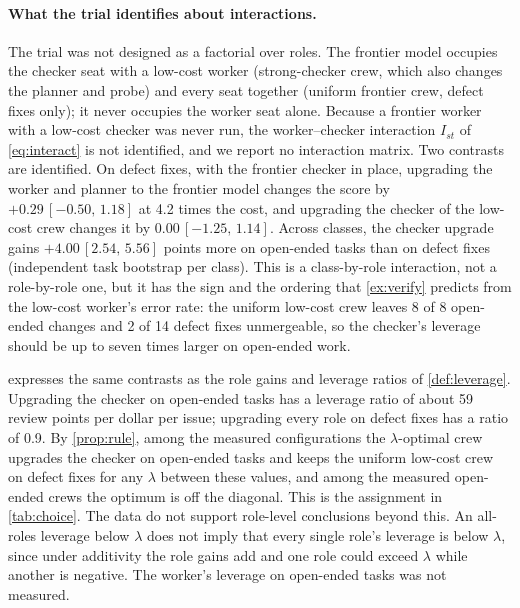 \documentclass[11pt,a4paper]{article}
\theoremstyle{definition}
\theoremstyle{remark}
\theoremstyle{definition}
\newcommand{\ci}[2]{\,[#1,\,#2]}
\begin{document}
\paragraph{What the trial identifies about interactions.} The trial was not designed as a factorial over roles. The frontier model occupies the checker seat with a low-cost worker (strong-checker crew, which also changes the planner and probe) and every seat together (uniform frontier crew, defect fixes only); it never occupies the worker seat alone. Because a frontier worker with a low-cost checker was never run, the worker--checker interaction $I_{st}$ of \eqref{eq:interact} is not identified, and we report no interaction matrix. Two contrasts are identified. On defect fixes, with the frontier checker in place, upgrading the worker and planner to the frontier model changes the score by $+0.29\ci{-0.50}{1.18}$ at 4.2 times the cost, and upgrading the checker of the low-cost crew changes it by $0.00\ci{-1.25}{1.14}$. Across classes, the checker upgrade gains $+4.00\ci{2.54}{5.56}$ points more on open-ended tasks than on defect fixes (independent task bootstrap per class). This is a class-by-role interaction, not a role-by-role one, but it has the sign and the ordering that \cref{ex:verify} predicts from the low-cost worker's error rate: the uniform low-cost crew leaves 8 of 8 open-ended changes and 2 of 14 defect fixes unmergeable, so the checker's leverage should be up to seven times larger on open-ended work.

 expresses the same contrasts as the role gains and leverage ratios of \cref{def:leverage}. Upgrading the checker on open-ended tasks has a leverage ratio of about 59 review points per dollar per issue; upgrading every role on defect fixes has a ratio of 0.9. By \cref{prop:rule}, among the measured configurations the $\lambda$-optimal crew upgrades the checker on open-ended tasks and keeps the uniform low-cost crew on defect fixes for any $\lambda$ between these values, and among the measured open-ended crews the optimum is off the diagonal. This is the assignment in \cref{tab:choice}. The data do not support role-level conclusions beyond this. An all-roles leverage below $\lambda$ does not imply that every single role's leverage is below $\lambda$, since under additivity the role gains add and one role could exceed $\lambda$ while another is negative. The worker's leverage on open-ended tasks was not measured.

\begin{table}[tbp]
\centering\small

\caption{Role gains $\Delta_s$ (paired, review points on 0--10, task-bootstrap 95\% CI), marginal cost $\Delta c_s$ per issue and leverage ratio $\Lambda_s$ (points per dollar), relative to the uniform low-cost crew ($n=3$). The two checker rows compare crews that also differ in the planner and probe seats (\cref{sec:trial}), so they are multi-seat contrasts dominated by the checker; a negative $\Lambda_s$ reflects a point estimate below zero, not a violation of \cref{ass:mono}.}
\label{tab:leverage}
\end{table}
\end{document}

